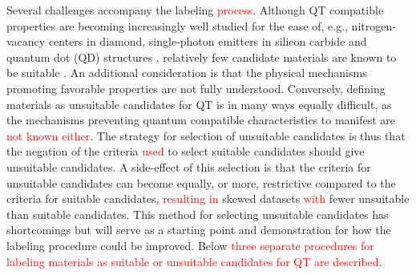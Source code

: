 \documentclass[superscriptaddress,unsortedaddress,
 amsmath,amssymb,
 aps,
]{revtex4-2}
\newcommand{\mrk}[1]{\textcolor{red}{#1}}
\begin{document}
Several challenges accompany the labeling \mrk{process.} 
Although QT compatible properties are becoming increasingly well studied for the case of, e.g., nitrogen-vacancy centers in diamond, single-photon emitters in silicon carbide and quantum dot (QD) structures \cite{Doherty_2013,Bathen2021,Aharonovich_2016}, relatively few candidate materials are known to be suitable  \cite{Atatuere2018,Zhang2020}. An additional consideration is that the physical mechanisms promoting favorable properties are not fully understood. 
Conversely, defining materials as unsuitable candidates for QT is in many ways equally difficult, as the mechanisms preventing quantum compatible characteristics to manifest are \mrk{not known either}.  
The strategy for selection of unsuitable candidates is thus that the negation of the criteria \mrk{used} to select suitable candidates should give unsuitable candidates.
A side-effect of this selection is that the criteria for unsuitable candidates can become equally, or more, restrictive compared to the criteria for suitable candidates\mrk{, resulting in} skewed datasets \mrk{with} fewer unsuitable than suitable candidates. 
This method for selecting unsuitable candidates has shortcomings but will serve as a starting point and demonstration for how the labeling procedure could be improved. 
Below \mrk{three separate procedures for labeling materials as suitable or unsuitable candidates for QT are described}. 
\end{document}
